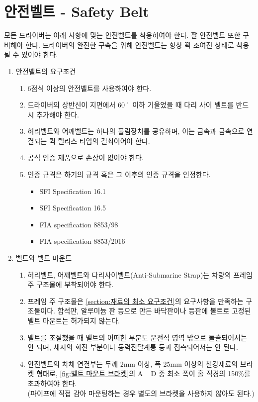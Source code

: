 \documentclass[final,a4paper,10pt]{report}
\begin{document}
\section{안전벨트 - Safety Belt} \label{section:안전벨트}
  모든 드라이버는 아래 사항에 맞는 안전벨트를 착용하여야 한다. 팔 안전벨트 또한 구비해야 한다. 드라이버의 완전한 구속을 위해 안전벨트는 항상 꽉 조여진 상태로 착용될 수 있어야 한다.
  \begin{enumerate}
    \item 안전벨트의 요구조건
      \begin{enumerate}
        \item 6점식 이상의 안전벨트를 사용하여야 한다.
        \item 드라이버의 상반신이 지면에서 60˚ 이하 기울었을 때 다리 사이 벨트를 반드시 추가해야 한다.
        \item 허리벨트와 어깨벨트는 하나의 풀림장치를 공유하며, 이는 금속과 금속으로 연결되는 퀵 릴리스 타입의 걸쇠이어야 한다.
        \item 공식 인증 제품으로 손상이 없어야 한다.
        
        \item 인증 규격은 하기의 규격 혹은 그 이후의 인증 규격을 인정한다.
          \begin{itemize}
            \item SFI Specification 16.1
            \item SFI Specification 16.5
            \item FIA specification 8853/98
            \item FIA specification 8853/2016
          \end{itemize}
      \end{enumerate}
    \item 벨트와 벨트 마운트
      \begin{enumerate}
        \item 허리벨트, 어깨벨트와 다리사이벨트(Anti-Submarine Strap)는 차량의 프레임 주 구조물에 부착되어야 한다.
        \item 프레임 주 구조물은 \cref{section:재료의 최소 요구조건}의 요구사항을 만족하는 구조물이다. 함석판, 알루미늄 판 등으로 만든 바닥판이나 등판에 볼트로 고정된 벨트 마운트는 허가되지 않는다.
        \item 벨트를 조절했을 때 벨트의 어떠한 부분도 운전석 영역 밖으로 돌출되어서는 안 되며, 섀시의 회전 부분이나 동력전달계통 등과 접촉되어서는 안 된다.
        \item 안전벨트의 차체 연결부는 두께 2mm 이상, 폭 25mm 이상의 철강재료의 브라켓 형태로, \cref{fig:벨트 마운트 브라켓}의 A \string~ D 중 최소 폭이 홀 직경의 150\%를 초과하여야 한다.\\
        (파이프에 직접 감아 마운팅하는 경우 별도의 브라켓을 사용하지 않아도 된다.)
        

\end{enumerate}
\end{enumerate}
\end{document}
